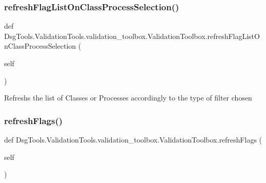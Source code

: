 \subsubsection{\texorpdfstring{refresh\+Flag\+List\+On\+Class\+Process\+Selection()}{refreshFlagListOnClassProcessSelection()}}
{\footnotesize\ttfamily def Dsg\+Tools.\+Validation\+Tools.\+validation\+\_\+toolbox.\+Validation\+Toolbox.\+refresh\+Flag\+List\+On\+Class\+Process\+Selection (\begin{DoxyParamCaption}\item[{}]{self }\end{DoxyParamCaption})}

\begin{DoxyVerb}Refreshs the list of Classes or Processes accordingly to the
type of filter chosen
\end{DoxyVerb}
 \mbox{\label{class_dsg_tools_1_1_validation_tools_1_1validation__toolbox_1_1_validation_toolbox_a6d976bd8898c775b1f3a68a2299fcb2a}} 
\subsubsection{\texorpdfstring{refresh\+Flags()}{refreshFlags()}}
{\footnotesize\ttfamily def Dsg\+Tools.\+Validation\+Tools.\+validation\+\_\+toolbox.\+Validation\+Toolbox.\+refresh\+Flags (\begin{DoxyParamCaption}\item[{}]{self }\end{DoxyParamCaption})}

